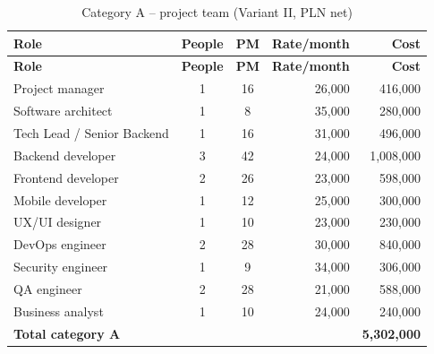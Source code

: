 \begin{longtable}{|L{5.0cm}|c|c|r|r|}
\caption{Category A -- project team (Variant II, PLN net)}
\label{tab:capex_zespol} \\
\hline
{}\textbf{Role} & \textbf{People} & \textbf{PM} & \textbf{Rate/month} & \textbf{Cost} \\
\hline
\endfirsthead
\hline
{}\textbf{Role} & \textbf{People} & \textbf{PM} & \textbf{Rate/month} & \textbf{Cost} \\
\hline
\endhead
Project manager & 1 & 16 & 26,000 & 416,000 \\
\hline
Software architect & 1 & 8 & 35,000 & 280,000 \\
\hline
Tech Lead / Senior Backend & 1 & 16 & 31,000 & 496,000 \\
\hline
Backend developer & 3 & 42 & 24,000 & 1,008,000 \\
\hline
Frontend developer & 2 & 26 & 23,000 & 598,000 \\
\hline
Mobile developer & 1 & 12 & 25,000 & 300,000 \\
\hline
UX/UI designer & 1 & 10 & 23,000 & 230,000 \\
\hline
DevOps engineer & 2 & 28 & 30,000 & 840,000 \\
\hline
Security engineer & 1 & 9 & 34,000 & 306,000 \\
\hline
QA engineer & 2 & 28 & 21,000 & 588,000 \\
\hline
Business analyst & 1 & 10 & 24,000 & 240,000 \\
\hline
{}\textbf{Total category A} & & & & \textbf{5,302,000} \\
\hline
\end{longtable}

